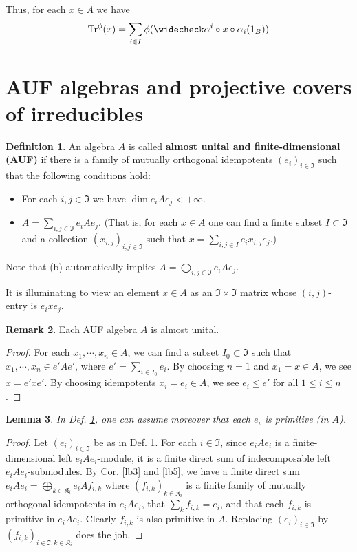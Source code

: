 \documentclass[11pt,b5paper,notitlepage]{article}
\theoremstyle{definition}
\newtheorem{df}{Definition}[section]
\newtheorem{rem}[df]{Remark}
\theoremstyle{plain}
\newtheorem{lm}[df]{Lemma}
\newcommand{\fk}{\mathfrak}
\newcommand{\wch}{\widecheck}
\newcommand{\Tr}{\mathrm{Tr}}
\numberwithin{equation}{section}
\begin{document}
Thus, for each $x\in A$ we have
\begin{align}\label{eq7}
\Tr^\phi(x)=\sum_{i\in I}\phi(\wch\alpha^i\circ x\circ\alpha_i(1_B))
\end{align}




\section{AUF algebras and projective covers of irreducibles}



\begin{df}\label{lb4}
An algebra $A$ is called \textbf{almost unital and finite-dimensional (AUF)} if there is a family of mutually orthogonal idempotents $(e_i)_{i\in\fk I}$ such that the following conditions hold:
\begin{itemize}
\item[(a)] For each $i,j\in\fk I$ we have $\dim e_iAe_j<+\infty$.
\item[(b)] $A=\sum_{i,j\in \fk I}e_iAe_j$. (That is, for each $x\in A$ one can find a finite subset $I\subset \fk I$ and a collection $(x_{i,j})_{i,j\in\fk I}$ such that $x=\sum_{i,j\in I}e_ix_{i,j}e_j$.) 
\end{itemize}
Note that (b) automatically implies $A=\bigoplus_{i,j\in \fk I}e_iAe_j$.
\end{df}

It is illuminating to view an element $x\in A$ as an $\fk I\times \fk I$ matrix whose $(i,j)$-entry is $e_ixe_j$.

\begin{rem}\label{lb48}
	Each AUF algebra $A$ is almost unital. 
\end{rem}
\begin{proof}
	For each $x_1,\cdots,x_n\in A$, we can find a subset $I_0\subset \fk I$ such that $x_1,\cdots,x_n\in e'Ae'$, where $e'=\sum_{i\in I_0}e_i$. By choosing $n=1$ and $x_1=x\in A$, we see $x=e'xe'$. By choosing idempotents $x_i=e_i\in A$, we see $e_i\leq e'$ for all $1\leq i\leq n$.
\end{proof}







\begin{lm}\label{lb12}
In Def. \ref{lb4}, one can assume moreover that each $e_i$ is primitive (in $A$).
\end{lm}


\begin{proof}
Let $(e_i)_{i\in\fk I}$ be as in Def. \ref{lb4}. For each $i\in\fk I$, since $e_iAe_i$ is a finite-dimensional left $e_iAe_i$-module, it is a finite direct sum of indecomposable left $e_iAe_i$-submodules. By Cor. \ref{lb3} and \ref{lb5}, we have a finite direct sum $e_iAe_i=\bigoplus_{k\in\fk K_i} e_iAf_{i,k}$ where $(f_{i,k})_{k\in\fk K_i}$ is a finite family of mutually orthogonal idempotents in $e_iAe_i$, that $\sum_k f_{i,k}=e_i$, and that each $f_{i,k}$ is primitive in $e_iAe_i$. Clearly $f_{i,k}$ is also primitive in $A$. Replacing $(e_i)_{i\in\fk I}$ by $(f_{i,k})_{i\in\fk I,k\in\fk K_i}$ does the job.
\end{proof}
\end{document}
